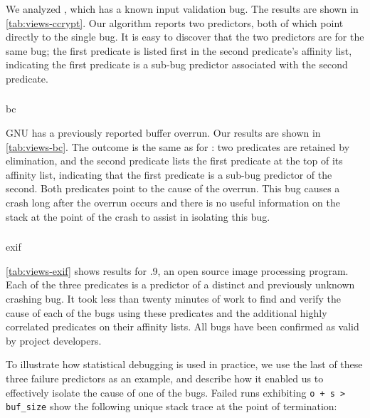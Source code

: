 We analyzed , which has a known input validation bug.  The
results are shown in \autoref{tab:views-ccrypt}.  Our algorithm
reports two predictors, both of which point directly to the single bug.
It is easy to discover that the two predictors are for the same bug;
the first predicate is listed first in the second predicate's affinity
list, indicating the first predicate is a sub-bug predictor associated
with the second predicate.

\subsubsection{\bc}

\begin{view}{\bc}{bc}
  
\end{view}

GNU  has a previously reported buffer overrun.  Our results
are shown in \autoref{tab:views-bc}.  The outcome is the same as for
\ccrypt: two predicates are retained by elimination, and the second
predicate lists the first predicate at the top of its affinity list,
indicating that the first predicate is a sub-bug predictor of the second.
Both predicates point to the cause of the overrun.  This bug causes a
crash long after the overrun occurs and there is no useful information
on the stack at the point of the crash to assist in isolating this
bug.

\subsubsection{\exif}

\begin{view}{\exif}{exif}
  
\end{view}

\autoref{tab:views-exif} shows results for .9, an open source
image processing program.  Each of the three predicates is a predictor
of a distinct and previously unknown crashing bug.  It took less than
twenty minutes of work to find and verify the cause of each of the bugs
using these predicates and the additional highly correlated predicates
on their affinity lists.  All bugs have been confirmed as valid by
\exif project developers.

To illustrate how statistical debugging is used in practice, we
use the last of these three failure predictors as an example, and
describe how it enabled us to
effectively isolate the cause of one of the bugs.  Failed runs
exhibiting \texttt{o + s > buf\_size} show the following unique stack
trace at the point of termination:

